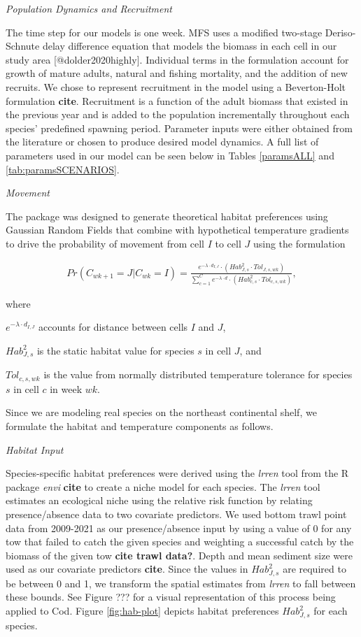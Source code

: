 \documentclass[
]{article}
\begin{document}
\emph{Population Dynamics and Recruitment}

The time step for our models is one week. MFS uses a modified two-stage Deriso-Schnute delay difference equation that models the biomass in each cell in our study area {[}@dolder2020highly{]}. Individual terms in the formulation account for growth of mature adults, natural and fishing mortality, and the addition of new recruits. We chose to represent recruitment in the model using a Beverton-Holt formulation \textbf{cite}. Recruitment is a function of the adult biomass that existed in the previous year and is added to the population incrementally throughout each species' predefined spawning period. Parameter inputs were either obtained from the literature or chosen to produce desired model dynamics. A full list of parameters used in our model can be seen below in Tables \ref{paramsALL} and \ref{tab:paramsSCENARIOS}.

\emph{Movement}

The package was designed to generate theoretical habitat preferences using Gaussian Random Fields that combine with hypothetical temperature gradients to drive the probability of movement from cell \(I\) to cell \(J\) using the formulation

\begin{align}
Pr(C_{wk+1}=J|C_{wk}=I) = \frac{e^{-\lambda \cdot d_{I,J}}\cdot(Hab^2_{J,s} \cdot Tol_{J,s,wk})}{\sum^C_{c=1}e^{-\lambda \cdot d} \cdot (Hab^2_{c,s} \cdot Tol_{c,s,wk})},
\label{moveP}
\end{align}

where

\(e^{-\lambda \cdot d_{I,J}}\) accounts for distance between cells \(I\) and \(J\),

\(Hab^2_{J,s}\) is the static habitat value for species \(s\) in cell \(J\), and

\(Tol_{c,s,wk}\) is the value from normally distributed temperature tolerance for species \(s\) in cell \(c\) in week \(wk\).

Since we are modeling real species on the northeast continental shelf, we formulate the habitat and temperature components as follows.

\emph{Habitat Input}

Species-specific habitat preferences were derived using the \emph{lrren} tool from the R package \emph{envi} \textbf{cite} to create a niche model for each species. The \emph{lrren} tool estimates an ecological niche using the relative risk function by relating presence/absence data to two covariate predictors. We used bottom trawl point data from 2009-2021 as our presence/absence input by using a value of 0 for any tow that failed to catch the given species and weighting a successful catch by the biomass of the given tow \textbf{cite trawl data?}. Depth and mean sediment size were used as our covariate predictors \textbf{cite}. Since the values in \(Hab^2_{J,s}\) are required to be between 0 and 1, we transform the spatial estimates from \emph{lrren} to fall between these bounds. See Figure ??? for a visual representation of this process being applied to Cod. Figure \ref{fig:hab-plot} depicts habitat preferences \(Hab^2_{J,s}\) for each species.
\end{document}
